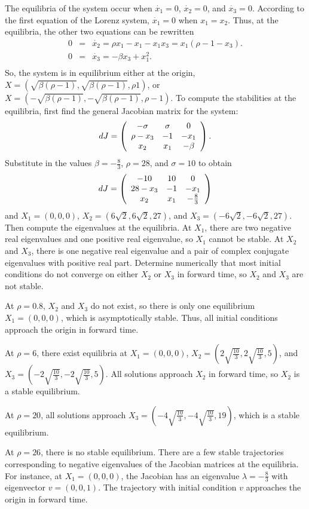 \soln The equilibria of the system occur when $\dot{x_1} = 0$, $\dot{x_2}
= 0$, and $\dot{x_3} = 0$.  According to the first equation of the Lorenz
system, $\dot{x_1} = 0$ when $x_1 = x_2$.  Thus, at the equilibria, the
other two equations can be rewritten
\[
\begin{array}{rcl}
0 & = & \dot{x_2} = \rho x_1 - x_1 - x_1x_3 = x_1(\rho - 1 - x_3). \\
0 & = & \dot{x_3} = -\beta x_3 + x_1^2. \\
\end{array}
\]
So, the system is in equilibrium either at the origin, $X =
(\sqrt{\beta (\rho - 1)}, \sqrt{\beta (\rho - 1)}, \rho 1)$, or
$X = (-\sqrt{\beta (\rho - 1)}, -\sqrt{\beta (\rho - 1)}, \rho - 1)$.
To compute the stabilities at the equilibria, first find the general
Jacobian matrix for the system:
\[
dJ = \left(\begin{array}{ccc} -\sigma & \sigma & 0 \\ \rho - x_3 & -1 & -x_1 \\ x_2 & x_1 & -\beta\end{array}\right).
\]
Substitute in the values $\beta = -\frac{8}{3}$, $\rho = 28$, and $\sigma
= 10$ to obtain
\[
dJ = \left(\begin{array}{ccc} -10 & 10 & 0 \\ 28 - x_3 & -1 & -x_1 \\ x_2 & x_1 & -\frac{8}{3}\end{array}\right)
\]
and $X_1 = (0,0,0)$, $X_2 = (6\sqrt{2},6\sqrt{2},27)$, and
$X_3 = (-6\sqrt{2},-6\sqrt{2},27)$.  Then compute the eigenvalues at the
equilibria.  At $X_1$, there are two negative real eigenvalues and one 
positive real eigenvalue, so $X_1$ cannot be stable.  At $X_2$ and $X_3$,
there is one negative real eigenvalue and a pair of complex conjugate
eigenvalues with positive real part.  Determine numerically that most
initial conditions do not converge on either $X_2$ or $X_3$ in forward time,
so $X_2$ and $X_3$ are not stable.


At $\rho = 0.8$, $X_2$ and $X_3$ do not exist, so there is only one
equilibrium $X_1 = (0,0,0)$, which is asymptotically stable.  Thus, all
initial conditions approach the origin in forward time.

\para At $\rho = 6$, there exist equilibria at $X_1 = (0,0,0)$, $X_2 =
(2\sqrt{\frac{10}{3}}, 2\sqrt{\frac{10}{3}}, 5)$, and
$X_3 = (-2\sqrt{\frac{10}{3}}, -2\sqrt{\frac{10}{3}}, 5)$.  All solutions
approach $X_2$ in forward time, so $X_2$ is a stable equilibrium.

\para At $\rho = 20$, all solutions approach $X_3 = (-4\sqrt{\frac{10}{3}},
-4\sqrt{\frac{10}{3}}, 19)$, which is a stable equilibrium.

\para At $\rho = 26$, there is no stable equilibrium.  There are a few
stable trajectories corresponding to negative eigenvalues of the Jacobian
matrices at the equilibria.  For instance, at $X_1 = (0,0,0)$, the Jacobian
has an eigenvalue $\lambda = -\frac{8}{3}$ with eigenvector $v = (0,0,1)$.
The trajectory with initial condition $v$ approaches the origin in forward
time.

